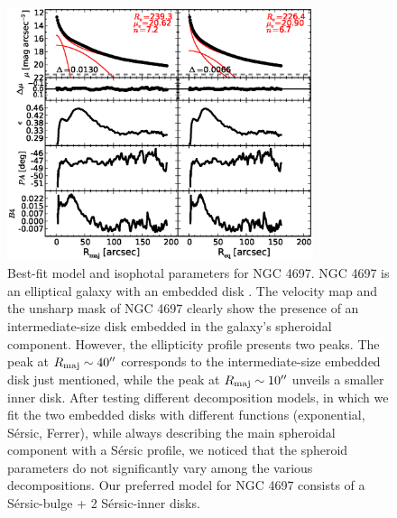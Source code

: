 \documentclass[preprint2]{emulateapj}
\newcommand{\fitfigurewidth}{0.8\textwidth}
\begin{document}
  \begin{figure}[h]
  \begin{center}
  \includegraphics[width=\fitfigurewidth]{images/n4697_1Dfit.eps}
  \caption{Best-fit model and isophotal parameters for NGC 4697.
  NGC 4697 is an elliptical galaxy with an embedded disk \citep{scorzabender1995}.
  The velocity map and the unsharp mask of NGC 4697 clearly show 
  the presence of an intermediate-size disk embedded in the galaxy's spheroidal component.
  However, the ellipticity profile presents two peaks. 
  The peak at $R_{\rm maj} \sim 40''$ corresponds to the intermediate-size embedded disk just mentioned,
  while the peak at $R_{\rm maj} \sim 10''$ unveils a smaller inner disk.
  After testing different decomposition models, 
  in which we fit the two embedded disks with different functions (exponential, S\'ersic, Ferrer),
  while always describing the main spheroidal component with a S\'ersic profile,
  we noticed that the spheroid parameters do not significantly vary among the various decompositions.
  Our preferred model for NGC 4697 consists of a S\'ersic-bulge + 2 S\'ersic-inner disks.
  }
  \end{center}
  \end{figure}
\end{document}
